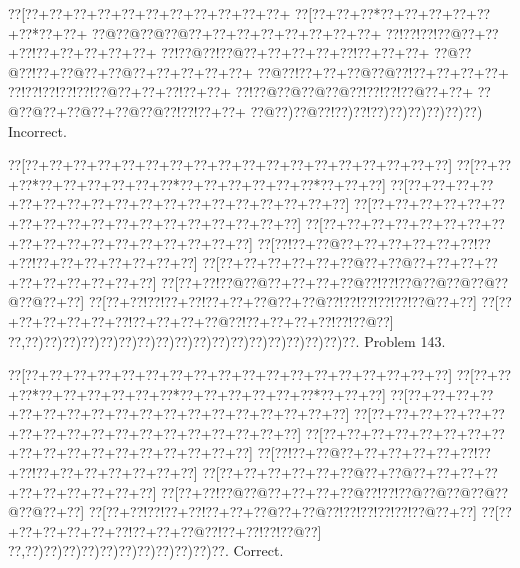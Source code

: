 \documentclass[a5paper]{article}
\begin{document}
\begin{center}
{\goo
\0??[\0??+\0??+\0??+\0??+\0??+\0??+\0??+\0??+\0??+\0??+\0??+
\0??[\0??+\0??+\0??*\0??+\0??+\0??+\0??+\0??+\0??*\0??+\0??+
\0??@\0??@\0??@\0??@\0??+\0??+\0??+\0??+\0??+\0??+\0??+\0??+
\0??!\0??!\0??!\0??@\0??+\0??+\0??!\0??+\0??+\0??+\0??+\0??+
\0??!\0??@\0??!\0??@\0??+\0??+\0??+\0??+\0??!\0??+\0??+\0??+
\0??@\0??@\0??!\0??+\0??@\0??+\0??@\0??+\0??+\0??+\0??+\0??+
\0??@\0??!\0??+\0??+\0??@\0??@\0??!\0??+\0??+\0??+\0??+
\0??!\0??!\0??!\0??!\0??!\0??@\0??+\0??+\0??!\0??+\0??+
\0??!\0??@\0??@\0??@\0??@\0??!\0??!\0??!\0??@\0??+\0??+
\0??@\0??@\0??+\0??@\0??+\0??@\0??@\0??!\0??!\0??+\0??+
\0??@\0??)\0??@\0??!\0??)\0??!\0??)\0??)\0??)\0??)\0??)\0??)
}
Incorrect. 

\end{center}
\newpage
\begin{center}
{\goo
\0??[\0??+\0??+\0??+\0??+\0??+\0??+\0??+\0??+\0??+\0??+\0??+\0??+\0??+\0??+\0??+\0??+\0??+\0??]
\0??[\0??+\0??+\0??*\0??+\0??+\0??+\0??+\0??+\0??*\0??+\0??+\0??+\0??+\0??+\0??*\0??+\0??+\0??]
\0??[\0??+\0??+\0??+\0??+\0??+\0??+\0??+\0??+\0??+\0??+\0??+\0??+\0??+\0??+\0??+\0??+\0??+\0??]
\0??[\0??+\0??+\0??+\0??+\0??+\0??+\0??+\0??+\0??+\0??+\0??+\0??+\0??+\0??+\0??+\0??+\0??+\0??]
\0??[\0??+\0??+\0??+\0??+\0??+\0??+\0??+\0??+\0??+\0??+\0??+\0??+\0??+\0??+\0??+\0??+\0??+\0??]
\0??[\0??!\0??+\0??@\0??+\0??+\0??+\0??+\0??+\0??!\0??+\0??!\0??+\0??+\0??+\0??+\0??+\0??+\0??]
\0??[\0??+\0??+\0??+\0??+\0??+\0??@\0??+\0??@\0??+\0??+\0??+\0??+\0??+\0??+\0??+\0??+\0??+\0??]
\0??[\0??+\0??!\0??@\0??@\0??+\0??+\0??+\0??@\0??!\0??!\0??@\0??@\0??@\0??@\0??@\0??@\0??+\0??]
\0??[\0??+\0??!\0??!\0??+\0??!\0??+\0??+\0??@\0??+\0??@\0??!\0??!\0??!\0??!\0??!\0??@\0??+\0??]
\0??[\0??+\0??+\0??+\0??+\0??+\0??!\0??+\0??+\0??+\0??@\0??!\0??+\0??+\0??+\0??!\0??!\0??@\0??]
\0??,\0??)\0??)\0??)\0??)\0??)\0??)\0??)\0??)\0??)\0??)\0??)\0??)\0??)\0??)\0??)\0??)\0??)\0??.
}
Problem 143.

\end{center}
\begin{center}
{\goo
\0??[\0??+\0??+\0??+\0??+\0??+\0??+\0??+\0??+\0??+\0??+\0??+\0??+\0??+\0??+\0??+\0??+\0??+\0??]
\0??[\0??+\0??+\0??*\0??+\0??+\0??+\0??+\0??+\0??*\0??+\0??+\0??+\0??+\0??+\0??*\0??+\0??+\0??]
\0??[\0??+\0??+\0??+\0??+\0??+\0??+\0??+\0??+\0??+\0??+\0??+\0??+\0??+\0??+\0??+\0??+\0??+\0??]
\0??[\0??+\0??+\0??+\0??+\0??+\0??+\0??+\0??+\0??+\0??+\0??+\0??+\0??+\0??+\0??+\0??+\0??+\0??]
\0??[\0??+\0??+\0??+\0??+\0??+\0??+\0??+\0??+\0??+\0??+\0??+\0??+\0??+\0??+\0??+\0??+\0??+\0??]
\0??[\0??!\0??+\0??@\0??+\0??+\0??+\0??+\0??+\0??!\0??+\0??!\0??+\0??+\0??+\0??+\0??+\0??+\0??]
\0??[\0??+\0??+\0??+\0??+\0??+\0??@\0??+\0??@\0??+\0??+\0??+\0??+\0??+\0??+\0??+\0??+\0??+\0??]
\0??[\0??+\0??!\0??@\0??@\0??+\0??+\0??+\0??@\0??!\0??!\0??@\0??@\0??@\0??@\0??@\0??@\0??+\0??]
\0??[\0??+\0??!\0??!\0??+\0??!\0??+\0??+\0??@\0??+\0??@\0??!\0??!\0??!\0??!\0??!\0??@\0??+\0??]
\0??[\0??+\0??+\0??+\0??+\0??+\0??!\0??+\0??+\0??@\0??!\0??+\0??!\0??!\0??@\0??]
\0??,\0??)\0??)\0??)\0??)\0??)\0??)\0??)\0??)\0??)\0??)\0??.
}
Correct. 

\end{center}
\end{document}
